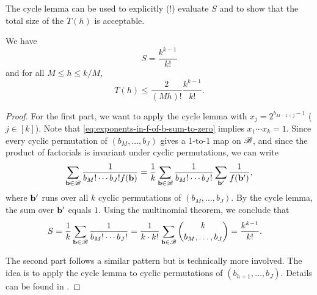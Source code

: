 The cycle lemma can be used to explicitly (!) evaluate $S$ and to show that the total size of the $T(h)$ is acceptable.
\begin{lemma} \label{lem:evaluate-S-and-T}
    We have
    \begin{equation*}
        S = \frac{k^{k - 1}}{k!}
    \end{equation*}
    and for all $M \le h \le k/M$,
    \begin{equation*}
        T(h) \le \frac{2}{(Mh)!} \frac{k^{k - 1}}{k!}.
    \end{equation*}
\end{lemma}

\begin{proof}
    For the first part, we want to apply the cycle lemma with $x_j = 2^{b_{M - 1 + j} - 1}$ ($j \in [k]$).
    Note that \eqref{eq:exponents-in-f-of-b-sum-to-zero} implies $x_1 \cdots x_k = 1$.
    Since every cyclic permutation of $(b_M, \dots, b_J)$ gives a 1-to-1 map on $\mathscr{B}$, and since the product of factorials is invariant under cyclic permutations, we can write
    \begin{equation*}
        \sum \limits_{\mathbf{b} \in \mathscr{B}} \frac{1}{b_M! \cdots b_J! f(\mathbf{b})} = \frac{1}{k} \sum \limits_{\mathbf{b} \in \mathscr{B}} \frac{1}{b_M! \cdots b_J!} \sum \limits_{\mathbf{b}'} \frac{1}{f(\mathbf{b}')},
    \end{equation*}
    where $\mathbf{b}'$ runs over all $k$ cyclic permutations of $(b_M, \dots, b_J)$.
    By the cycle lemma, the sum over $\mathbf{b}'$ equals $1$. 
    Using the multinomial theorem, we conclude that
    \begin{align*}
        S &= \frac{1}{k} \sum \limits_{\mathbf{b} \in \mathscr{B}} \frac{1}{b_M! \cdots b_J!} = \frac{1}{k \cdot k!} \sum \limits_{\mathbf{b} \in \mathscr{B}} \binom{k}{b_M, \dots, b_J} = \frac{k^{k - 1}}{k!}.
    \end{align*}

    The second part follows a similar pattern but is technically more involved. The idea is to apply the cycle lemma to cyclic permutations of $(b_{h + 1}, \dots, b_J)$.
    Details can be found in \cite{fordlecturenotes}.
\end{proof}

